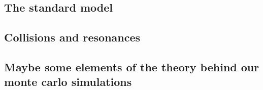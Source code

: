 \subsection{The standard model}
\label{sec:org8632faf}
\subsection{Collisions and resonances}
\label{sec:org874321a}
\subsection{Maybe some elements of the theory behind our monte carlo simulations}
\label{sec:orgfe09146}
